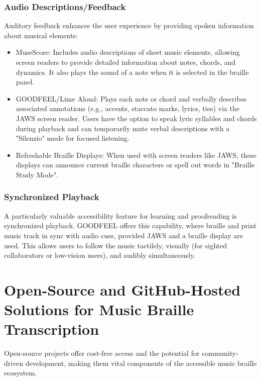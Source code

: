 \subsubsection{Audio Descriptions/Feedback}
Auditory feedback enhances the user experience by providing spoken information about musical elements:
\begin{itemize}
    \item MuseScore: Includes audio descriptions of sheet music elements, allowing screen readers to provide detailed information about notes, chords, and dynamics. \cite{musescore-braille} It also plays the sound of a note when it is selected in the braille panel. \cite{musescore-braille}
    \item GOODFEEL/Lime Aloud: Plays each note or chord and verbally describes associated annotations (e.g., accents, staccato marks, lyrics, ties) via the JAWS screen reader. \cite{dancingdots-goodfeel, canasstech-limealoud} Users have the option to speak lyric syllables and chords during playback \cite{dancingdots-goodfeel} and can temporarily mute verbal descriptions with a "Silenzio" mode for focused listening. \cite{dancingdots-goodfeel}
    \item Refreshable Braille Displays: When used with screen readers like JAWS, these displays can announce current braille characters or spell out words in "Braille Study Mode". \cite{focus-blue}
\end{itemize}

\subsubsection{Synchronized Playback}
A particularly valuable accessibility feature for learning and proofreading is synchronized playback. GOODFEEL offers this capability, where braille and print music track in sync with audio cues, provided JAWS and a braille display are used. \cite{dancingdots-goodfeel} This allows users to follow the music tactilely, visually (for sighted collaborators or low-vision users), and audibly simultaneously.

\section{Open-Source and GitHub-Hosted Solutions for Music Braille Transcription}

Open-source projects offer cost-free access and the potential for community-driven development, making them vital components of the accessible music braille ecosystem.

